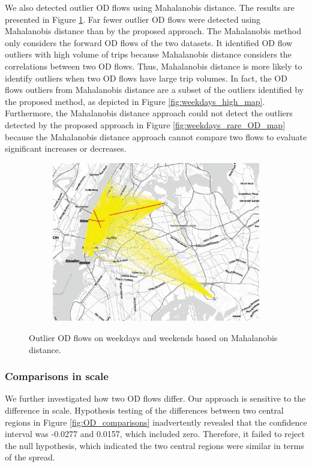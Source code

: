 \documentclass[a4paper,UKenglish]{lipics-v2018}
\begin{document}
We also detected outlier OD flows using Mahalanobis distance.
The results are presented in Figure \ref{fig:week_ends_MD}. 
Far fewer outlier OD flows were detected using Mahalanobis distance than by the proposed approach.
The Mahalanobis method only considers the forward OD flows of the two datasets.
It identified OD flow outliers with high volume of trips because Mahalanobis distance considers the correlations between two OD flows.
Thus, Mahalanobis distance is more likely to identify outliers when two OD flows have large trip volumes.
In fact, the OD flows outliers from Mahalanobis distance are a subset of the outliers identified by the proposed method, as depicted in Figure \ref{fig:weekdays_high_map}.
Furthermore, the Mahalanobis distance approach could not detect the outliers detected by the proposed approach in Figure \ref{fig:weekdays_rare_OD_map} because the Mahalanobis distance approach cannot compare two flows to evaluate significant increases or decreases.


\begin{figure}
	\centering
	\begin{subfigure}[b]{0.49\textwidth}
		\includegraphics[width=\textwidth]{images/out_weekdays_weekends_md2_outlier.eps}
	\end{subfigure}
	\caption{Outlier OD flows on weekdays and weekends based on Mahalanobis distance. }\label{fig:week_ends_MD}	
\end{figure}

\subsubsection{Comparisons in scale}
We further investigated how two OD flows differ.
Our approach is sensitive to the difference in scale.
Hypothesis testing of the differences between two central regions in Figure \ref{fig:OD_comparisons} inadvertently revealed that the confidence interval was -0.0277 and 0.0157, which included zero.
Therefore, it failed to reject the null hypothesis, which indicated the two central regions were similar in terms of the spread.
\end{document}
